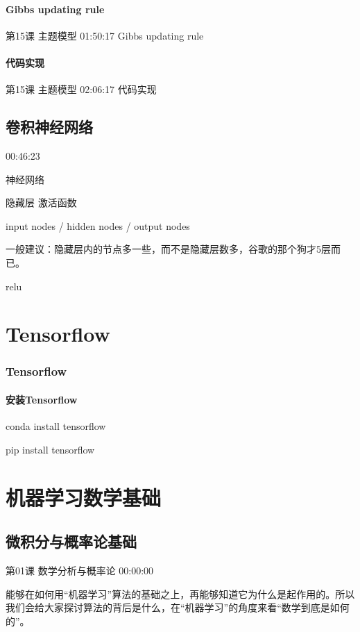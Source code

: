 \documentclass[UTF8]{ctexbook}
\begin{document}
\subsection{Gibbs updating rule}

第15课 主题模型 01:50:17 Gibbs updating rule

\subsection{代码实现}

第15课 主题模型 02:06:17 代码实现

\chapter{卷积神经网络}

00:46:23

神经网络

隐藏层 激活函数

input nodes / hidden nodes / output nodes

一般建议：隐藏层内的节点多一些，而不是隐藏层数多，谷歌的那个狗才5层而已。

relu

\part{Tensorflow}

\section{Tensorflow}

\subsection{安装Tensorflow}

        conda install tensorflow

        pip install tensorflow

\part{机器学习数学基础}

\chapter{微积分与概率论基础}

第01课 数学分析与概率论 00:00:00

能够在如何用“机器学习”算法的基础之上，再能够知道它为什么是起作用的。所以我们会给大家探讨算法的背后是什么，在“机器学习”的角度来看“数学到底是如何的”。
\end{document}
